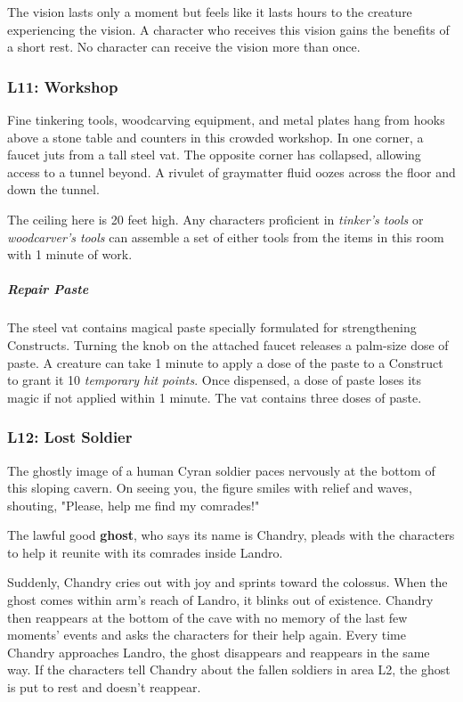 \documentclass[10pt,a4paper,twoside,bg=print,twocolumn,openany,nodeprecatedcode]{dndbook}
\begin{document}
The vision lasts only a moment but feels like it lasts hours to the creature experiencing the vision. A character who receives this vision gains the benefits of a short rest. No character can receive the vision more than once.

\subsubsection{L11: Workshop}
\begin{DndReadAloud}{}
Fine tinkering tools, woodcarving equipment, and metal plates hang from hooks above a stone table and counters in this crowded workshop. In one corner, a faucet juts from a tall steel vat. The opposite corner has collapsed, allowing access to a tunnel beyond. A rivulet of graymatter fluid oozes across the floor and down the tunnel.

\end{DndReadAloud}

The ceiling here is 20 feet high. Any characters proficient in \textit{tinker's tools} or \textit{woodcarver's tools} can assemble a set of either tools from the items in this room with 1 minute of work.

\subparagraph{Repair Paste}
The steel vat contains magical paste specially formulated for strengthening Constructs. Turning the knob on the attached faucet releases a palm-size dose of paste. A creature can take 1 minute to apply a dose of the paste to a Construct to grant it 10 \textit{temporary hit points}. Once dispensed, a dose of paste loses its magic if not applied within 1 minute. The vat contains three doses of paste.

\subsubsection{L12: Lost Soldier}
\begin{DndReadAloud}{}
The ghostly image of a human Cyran soldier paces nervously at the bottom of this sloping cavern. On seeing you, the figure smiles with relief and waves, shouting, "Please, help me find my comrades!"

\end{DndReadAloud}

The lawful good \textbf{ghost}, who says its name is Chandry, pleads with the characters to help it reunite with its comrades inside Landro.

Suddenly, Chandry cries out with joy and sprints toward the colossus. When the ghost comes within arm's reach of Landro, it blinks out of existence. Chandry then reappears at the bottom of the cave with no memory of the last few moments' events and asks the characters for their help again. Every time Chandry approaches Landro, the ghost disappears and reappears in the same way. If the characters tell Chandry about the fallen soldiers in area L2, the ghost is put to rest and doesn't reappear.
\end{document}

